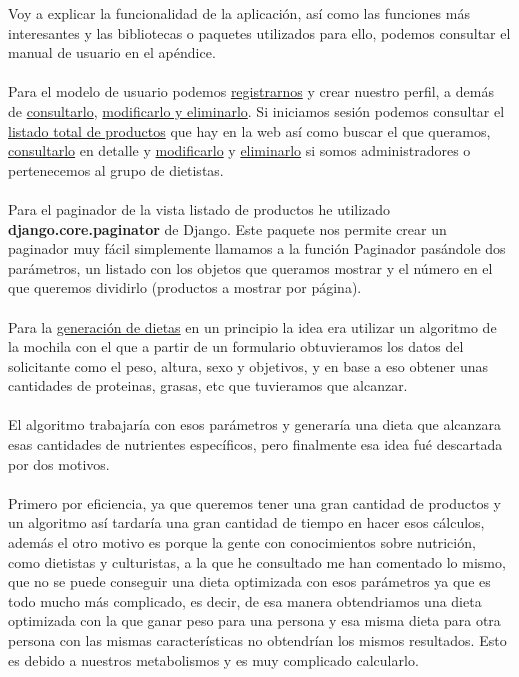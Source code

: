 Voy a explicar la funcionalidad de la aplicación, así como las funciones más interesantes y las bibliotecas o paquetes utilizados para ello, podemos consultar el manual de usuario en el apéndice. \\ \\

Para el modelo de usuario podemos \href{https://github.com/josemip98/TFG/issues/4}{registrarnos} y crear nuestro perfil, a demás de \href{https://github.com/josemip98/TFG/issues/21}{consultarlo}, \href{https://github.com/josemip98/TFG/issues/11}{modificarlo y eliminarlo}.
Si iniciamos sesión podemos consultar el \href{https://github.com/josemip98/TFG/issues/2}{listado total de productos} que hay en la web así como buscar el que queramos, \href{https://github.com/josemip98/TFG/issues/3}{consultarlo} en detalle y
\href{https://github.com/josemip98/TFG/issues/8}{modificarlo} y \href{https://github.com/josemip98/TFG/issues/9}{eliminarlo} si somos administradores o pertenecemos al grupo de dietistas.\\ \\

Para el paginador de la vista listado de productos he utilizado \textbf{django.core.paginator} de Django. Este paquete nos permite crear 
un paginador muy fácil simplemente llamamos a la función Paginador pasándole dos parámetros, un listado con los objetos que 
queramos mostrar y el número en el que queremos dividirlo (productos a mostrar por página). \\ \\

Para la \href{https://github.com/josemip98/TFG/issues/12}{generación de dietas} en un principio la idea era utilizar un algoritmo de la mochila con el que a partir de un formulario obtuvieramos los datos del solicitante
como el peso, altura, sexo y objetivos, y en base a eso obtener unas cantidades de proteinas, grasas, etc que tuvieramos que alcanzar.\\ \\

El algoritmo trabajaría con esos parámetros y generaría una dieta que alcanzara esas cantidades de nutrientes específicos, pero finalmente esa idea fué descartada por dos motivos.\\\\

Primero por eficiencia, ya que queremos tener una gran cantidad de productos y un algoritmo así tardaría una gran cantidad de tiempo en hacer esos cálculos, además el otro motivo es 
porque la gente con conocimientos sobre nutrición, como dietistas y culturistas, a la que he consultado me han comentado lo mismo, que no se puede conseguir una dieta optimizada con esos 
parámetros ya que es todo mucho más complicado, es decir, de esa manera obtendriamos una dieta optimizada con la que ganar peso para una persona y esa misma dieta para otra persona con 
las mismas características no obtendrían los mismos resultados. Esto es debido a nuestros metabolismos y es muy complicado calcularlo.\\\\

